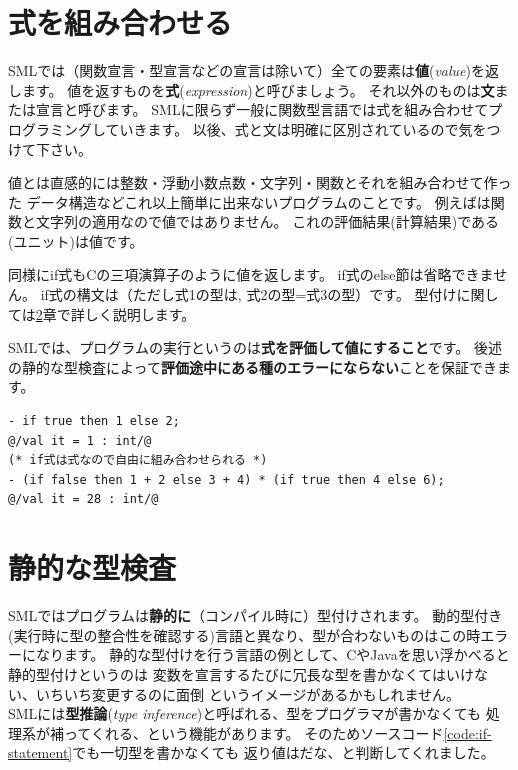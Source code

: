 \documentclass[11pt,a4paper]{jarticle}
\begin{document}
\section{式を組み合わせる}

SMLでは（関数宣言・型宣言などの宣言は除いて）全ての要素は{\bfseries 値}({\itshape value})を返します。
値を返すものを{\bfseries 式}({\itshape expression})と呼びましょう。
それ以外のものは{\bfseries 文}または宣言と呼びます。
SMLに限らず一般に関数型言語では式を組み合わせてプログラミングしていきます。
以後、式と文は明確に区別されているので気をつけて下さい。

値とは直感的には整数・浮動小数点数・文字列・関数とそれを組み合わせて作った
データ構造などこれ以上簡単に出来ないプログラムのことです。
例えばは関数と文字列の適用なので値ではありません。
これの評価結果(計算結果)である\prog{()}(ユニット)は値です。

同様にif式もCの三項演算子のように値を返します。
if式のelse節は省略できません。
if式の構文は（ただし式1の型は, 式2の型=式3の型）です。
型付けに関しては\ref{sec:static-typing}章で詳しく説明します。

SMLでは、プログラムの実行というのは{\bfseries 式を評価して値にすること}です。
後述の静的な型検査によって{\bfseries 評価途中にある種のエラーにならない}ことを保証できます。

\begin{lstlisting}[caption=if文は式,label=code:if-statement]
- if true then 1 else 2;
@/val it = 1 : int/@
(* if式は式なので自由に組み合わせられる *)
- (if false then 1 + 2 else 3 + 4) * (if true then 4 else 6);
@/val it = 28 : int/@
\end{lstlisting}

\section{静的な型検査}
\label{sec:static-typing}

SMLではプログラムは{\bfseries 静的に}（コンパイル時に）型付けされます。
動的型付き(実行時に型の整合性を確認する)言語と異なり、型が合わないものはこの時エラーになります。
静的な型付けを行う言語の例として、CやJavaを思い浮かべると静的型付けというのは
変数を宣言するたびに冗長な型を書かなくてはいけない、いちいち変更するのに面倒
というイメージがあるかもしれません。\\
SMLには{\bfseries 型推論}({\itshape type inference})と呼ばれる、型をプログラマが書かなくても
処理系が補ってくれる、という機能があります。
そのためソースコード\ref{code:if-statement}でも一切型を書かなくても
返り値はだな、と判断してくれました。
\end{document}
